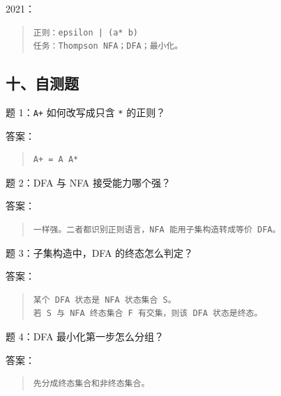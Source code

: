 \documentclass[UTF8,zihao=-4]{ctexart}
\begin{document}
2021：


\begin{quote}
\footnotesize
\begin{verbatim}
正则：epsilon | (a* b)
任务：Thompson NFA；DFA；最小化。
\end{verbatim}
\end{quote}


\subsection{十、自测题}


题 1：\texttt{A+} 如何改写成只含 \texttt{*} 的正则？


答案：


\begin{quote}
\footnotesize
\begin{verbatim}
A+ = A A*
\end{verbatim}
\end{quote}


题 2：DFA 与 NFA 接受能力哪个强？


答案：


\begin{quote}
\footnotesize
\begin{verbatim}
一样强。二者都识别正则语言，NFA 能用子集构造转成等价 DFA。
\end{verbatim}
\end{quote}


题 3：子集构造中，DFA 的终态怎么判定？


答案：


\begin{quote}
\footnotesize
\begin{verbatim}
某个 DFA 状态是 NFA 状态集合 S。
若 S 与 NFA 终态集合 F 有交集，则该 DFA 状态是终态。
\end{verbatim}
\end{quote}


题 4：DFA 最小化第一步怎么分组？


答案：


\begin{quote}
\footnotesize
\begin{verbatim}
先分成终态集合和非终态集合。
\end{verbatim}
\end{quote}
\end{document}
